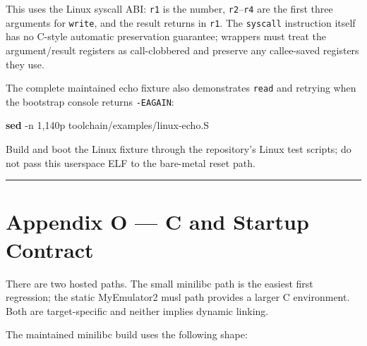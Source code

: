 \documentclass[
  oneside,
  openany]{book}
\newenvironment{Shaded}{\begin{snugshade}}{\end{snugshade}}
\newcommand{\AttributeTok}[1]{\textcolor[rgb]{0.13,0.29,0.53}{#1}}
\newcommand{\FunctionTok}[1]{\textcolor[rgb]{0.13,0.29,0.53}{\textbf{#1}}}
\newcommand{\NormalTok}[1]{#1}
\newcommand{\StringTok}[1]{\textcolor[rgb]{0.31,0.60,0.02}{#1}}
\begin{document}
This uses the Linux syscall ABI: \texttt{r1} is the number,
\texttt{r2}--\texttt{r4} are the first three arguments for
\texttt{write}, and the result returns in \texttt{r1}. The
\texttt{syscall} instruction itself has no C-style automatic
preservation guarantee; wrappers must treat the argument/result
registers as call-clobbered and preserve any callee-saved registers they
use.

The complete maintained echo fixture also demonstrates \texttt{read} and
retrying when the bootstrap console returns \texttt{-EAGAIN}:

\begin{Shaded}
\begin{Highlighting}[]
\FunctionTok{sed} \AttributeTok{{-}n} \StringTok{\textquotesingle{}1,140p\textquotesingle{}}\NormalTok{ toolchain/examples/linux{-}echo.S}
\end{Highlighting}
\end{Shaded}

Build and boot the Linux fixture through the repository's Linux test
scripts; do not pass this userspace ELF to the bare-metal reset path.

\begin{center}\rule{0.5\linewidth}{0.5pt}\end{center}

\hypertarget{appendix-o-c-and-startup-contract}{%
\chapter{Appendix O --- C and Startup
Contract}\label{appendix-o-c-and-startup-contract}}

There are two hosted paths. The small minilibc path is the easiest first
regression; the static MyEmulator2 musl path provides a larger C
environment. Both are target-specific and neither implies dynamic
linking.

The maintained minilibc build uses the following shape:
\end{document}
